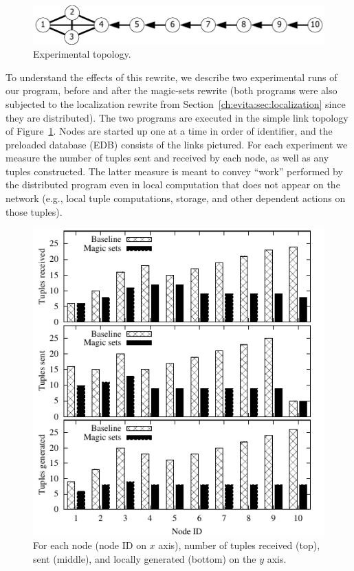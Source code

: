 \begin{figure}
\centering
\includegraphics[scale=1.2]{figures/Topology}
\caption{Experimental topology.}
\label{ch:evita:fig:topo}
\end{figure}

To understand the effects of this rewrite, we describe two experimental
runs of our program, before and after the magic-sets rewrite (both
programs were also subjected to the localization rewrite from
Section~\ref{ch:evita:sec:localization} since they are distributed).  The two
programs are executed in the simple link topology of
Figure~\ref{ch:evita:fig:topo}. Nodes are started up one at a time in order of
identifier, and the preloaded database (EDB) consists of the links pictured. For each experiment we measure the number of
tuples sent and received by each node, as well as any 
tuples constructed. The latter measure is meant to convey ``work''
performed by the distributed program even in local computation that does
not appear on the network (e.g., local tuple computations, storage, and
other dependent actions on those tuples).

\begin{figure}
\centering
\includegraphics{figures/magicNumbers}
\ssp
\caption{For each node (node ID on $x$ axis), number of tuples received
  (top), sent (middle), and locally generated (bottom) on the $y$ axis.}
\label{ch:evita:fig:magicresults}
\end{figure}


